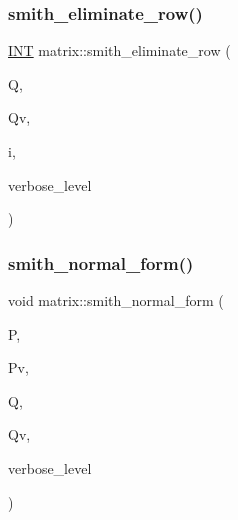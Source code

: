 \mbox{\label{classmatrix_a6672b6bbaad6060b6c230a2c10ec2eb5}} 
\subsubsection{\texorpdfstring{smith\+\_\+eliminate\+\_\+row()}{smith\_eliminate\_row()}}
{\footnotesize\ttfamily \mbox{\hyperlink{galois_8h_a09fddde158a3a20bd2dcadb609de11dc}{I\+NT}} matrix\+::smith\+\_\+eliminate\+\_\+row (\begin{DoxyParamCaption}\item[{\mbox{\hyperlink{classmatrix}{matrix}} \&}]{Q,  }\item[{\mbox{\hyperlink{classmatrix}{matrix}} \&}]{Qv,  }\item[{\mbox{\hyperlink{galois_8h_a09fddde158a3a20bd2dcadb609de11dc}{I\+NT}}}]{i,  }\item[{\mbox{\hyperlink{galois_8h_a09fddde158a3a20bd2dcadb609de11dc}{I\+NT}}}]{verbose\+\_\+level }\end{DoxyParamCaption})}

\mbox{\label{classmatrix_aeb73764dd4346bb1a6998f2a3c507544}} 
\subsubsection{\texorpdfstring{smith\+\_\+normal\+\_\+form()}{smith\_normal\_form()}}
{\footnotesize\ttfamily void matrix\+::smith\+\_\+normal\+\_\+form (\begin{DoxyParamCaption}\item[{\mbox{\hyperlink{classmatrix}{matrix}} \&}]{P,  }\item[{\mbox{\hyperlink{classmatrix}{matrix}} \&}]{Pv,  }\item[{\mbox{\hyperlink{classmatrix}{matrix}} \&}]{Q,  }\item[{\mbox{\hyperlink{classmatrix}{matrix}} \&}]{Qv,  }\item[{\mbox{\hyperlink{galois_8h_a09fddde158a3a20bd2dcadb609de11dc}{I\+NT}}}]{verbose\+\_\+level }\end{DoxyParamCaption})}

\mbox{\label{classmatrix_a9041c3138924ebc58d539c9230898c6d}} 

